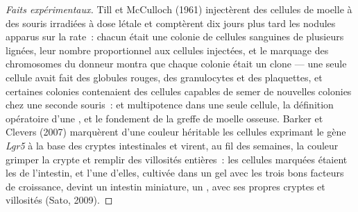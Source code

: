 \begin{proof}[Faits expérimentaux]
Till et McCulloch (1961) injectèrent des cellules de moelle à des souris
irradiées à dose létale et comptèrent dix jours plus tard les nodules
apparus sur la rate~: chacun était une colonie de cellules sanguines de
plusieurs lignées, leur nombre proportionnel aux cellules injectées, et
le marquage des chromosomes du donneur montra que chaque colonie était
un clone --- une seule cellule avait fait des globules rouges, des
granulocytes et des plaquettes, et certaines colonies contenaient des
cellules capables de semer de nouvelles colonies chez une seconde
souris~:  et multipotence dans une seule cellule, la
définition opératoire d'une , et le fondement de la greffe
de moelle osseuse. Barker et Clevers (2007) marquèrent d'une couleur
héritable les cellules exprimant le gène \emph{Lgr5} à la base des
cryptes intestinales et virent, au fil des semaines, la couleur grimper
la crypte et remplir des villosités entières~: les cellules marquées
étaient les  de l'intestin, et l'une d'elles, cultivée
dans un gel avec les trois bons facteurs de croissance, devint un
intestin miniature, un \emph{}, avec ses propres cryptes et
villosités (Sato, 2009).
\end{proof}

